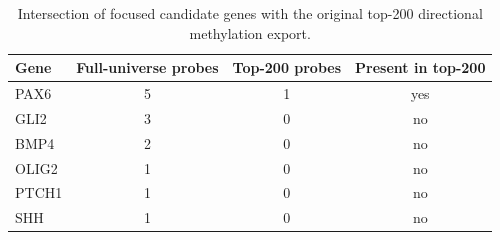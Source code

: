 \begin{table}[htbp]
\centering
\caption{Intersection of focused candidate genes with the original top-200 directional methylation export.}
\label{tab:focused_candidate_top200_intersection}
\begin{tabular}{lccc}
\hline
Gene & Full-universe probes & Top-200 probes & Present in top-200 \\
\hline
PAX6 & 5 & 1 & yes \\
GLI2 & 3 & 0 & no \\
BMP4 & 2 & 0 & no \\
OLIG2 & 1 & 0 & no \\
PTCH1 & 1 & 0 & no \\
SHH & 1 & 0 & no \\
\hline
\end{tabular}
\end{table}
